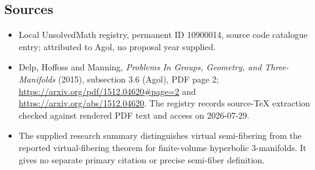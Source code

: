 \documentclass[11pt]{article}
\begin{document}
\subsection{Sources}
\begin{itemize}
\item Local UnsolvedMath registry, permanent ID 10900014, source code catalogue entry; attributed to Agol, no proposal year supplied.
\item Delp, Hoffoss and Manning, \emph{Problems In Groups, Geometry, and Three-Manifolds} (2015), subsection 3.6 (Agol), PDF page 2; \url{https://arxiv.org/pdf/1512.04620#page=2} and \url{https://arxiv.org/abs/1512.04620}. The registry records source-TeX extraction checked against rendered PDF text and access on 2026-07-29.
\item The supplied research summary distinguishes virtual semi-fibering from the reported virtual-fibering theorem for finite-volume hyperbolic $3$-manifolds. It gives no separate primary citation or precise semi-fiber definition.
\end{itemize}
\end{document}
